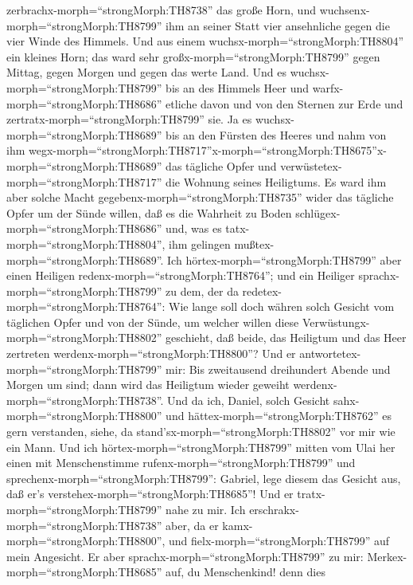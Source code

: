 zerbrachx-morph=``strongMorph:TH8738'' das große Horn, und
wuchsenx-morph=``strongMorph:TH8799'' ihm an seiner Statt vier
ansehnliche gegen die vier Winde des Himmels.  Und aus einem
wuchsx-morph=``strongMorph:TH8804'' ein kleines Horn; das ward sehr
großx-morph=``strongMorph:TH8799'' gegen Mittag, gegen Morgen und gegen
das werte Land.  Und es wuchsx-morph=``strongMorph:TH8799''
bis an des Himmels Heer und warfx-morph=``strongMorph:TH8686'' etliche
davon und von den Sternen zur Erde und
zertratx-morph=``strongMorph:TH8799'' sie.  Ja es
wuchsx-morph=``strongMorph:TH8689'' bis an den Fürsten des Heeres und
nahm von ihm
wegx-morph=``strongMorph:TH8717''\textbar x-morph=``strongMorph:TH8675''x-morph=``strongMorph:TH8689''
das tägliche Opfer und verwüstetex-morph=``strongMorph:TH8717'' die
Wohnung seines Heiligtums.  Es ward ihm aber solche Macht
gegebenx-morph=``strongMorph:TH8735'' wider das tägliche Opfer um der
Sünde willen, daß es die Wahrheit zu Boden
schlügex-morph=``strongMorph:TH8686'' und, was es
tatx-morph=``strongMorph:TH8804'', ihm gelingen
mußtex-morph=``strongMorph:TH8689''.  Ich
hörtex-morph=``strongMorph:TH8799'' aber einen Heiligen
redenx-morph=``strongMorph:TH8764''; und ein Heiliger
sprachx-morph=``strongMorph:TH8799'' zu dem, der da
redetex-morph=``strongMorph:TH8764'': Wie lange soll doch währen solch
Gesicht vom täglichen Opfer und von der Sünde, um welcher willen diese
Verwüstungx-morph=``strongMorph:TH8802'' geschieht, daß beide, das
Heiligtum und das Heer zertreten werdenx-morph=``strongMorph:TH8800''?
 Und er antwortetex-morph=``strongMorph:TH8799'' mir: Bis
zweitausend dreihundert Abende und Morgen um sind; dann wird das
Heiligtum wieder geweiht werdenx-morph=``strongMorph:TH8738''.
 Und da ich, Daniel, solch Gesicht
sahx-morph=``strongMorph:TH8800'' und
hättex-morph=``strongMorph:TH8762'' es gern verstanden, siehe, da
stand'sx-morph=``strongMorph:TH8802'' vor mir wie ein Mann.
 Und ich hörtex-morph=``strongMorph:TH8799'' mitten vom
Ulai her einen mit Menschenstimme rufenx-morph=``strongMorph:TH8799''
und sprechenx-morph=``strongMorph:TH8799'': Gabriel, lege diesem das
Gesicht aus, daß er's verstehex-morph=``strongMorph:TH8685''!
 Und er tratx-morph=``strongMorph:TH8799'' nahe zu mir. Ich
erschrakx-morph=``strongMorph:TH8738'' aber, da er
kamx-morph=``strongMorph:TH8800'', und
fielx-morph=``strongMorph:TH8799'' auf mein Angesicht. Er aber
sprachx-morph=``strongMorph:TH8799'' zu mir:
Merkex-morph=``strongMorph:TH8685'' auf, du Menschenkind! denn dies

